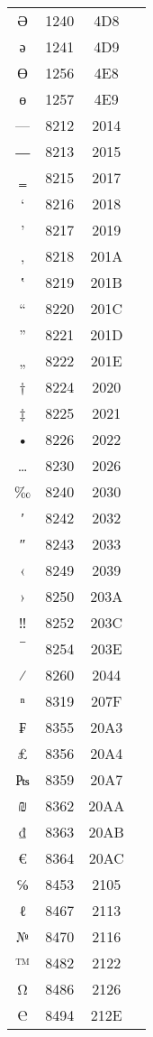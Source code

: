 \documentclass[10pt]{article}
\begin{document}
\begin{tabular}{crcl}
Ә&1240&4D8&\\
ә&1241&4D9&\\
Ө&1256&4E8&\\
ө&1257&4E9&\\
—&8212&2014&\\
―&8213&2015&\\
‗&8215&2017&\\
‘&8216&2018&\\
’&8217&2019&\\
‚&8218&201A&\\
‛&8219&201B&\\
“&8220&201C&\\
”&8221&201D&\\
„&8222&201E&\\
†&8224&2020&\\
‡&8225&2021&\\
•&8226&2022&\\
…&8230&2026&\\
‰&8240&2030&\\
′&8242&2032&\\
″&8243&2033&\\
‹&8249&2039&\\
›&8250&203A&\\
‼&8252&203C&\\
‾&8254&203E&\\
⁄&8260&2044&\\
ⁿ&8319&207F&\\
₣&8355&20A3&\\
₤&8356&20A4&\\
₧&8359&20A7&\\
₪&8362&20AA&\\
₫&8363&20AB&\\
€&8364&20AC&\\
℅&8453&2105&\\
ℓ&8467&2113&\\
№&8470&2116&\\
™&8482&2122&\\
Ω&8486&2126&\\
℮&8494&212E&\\
\end{tabular}
\end{document}
